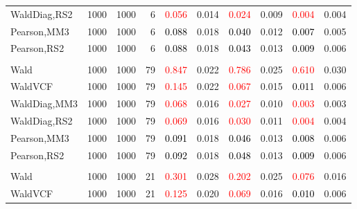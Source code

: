 \documentclass[
]{article}
\begin{document}
\begin{table}[H]
{\begin{tabular}[t]{lrrrrrrlrr}
\hspace{1em}WaldDiag,RS2 & 1000 & 1000 & 6 & \textcolor{red}{0.056} & 0.014 & \textcolor{red}{0.024} & 0.009 & \textcolor{red}{0.004} & 0.004\\
\hspace{1em}Pearson,MM3 & 1000 & 1000 & 6 & \textcolor{black}{0.088} & 0.018 & \textcolor{black}{0.040} & 0.012 & \textcolor{black}{0.007} & 0.005\\
\hspace{1em}Pearson,RS2 & 1000 & 1000 & 6 & \textcolor{black}{0.088} & 0.018 & \textcolor{black}{0.043} & 0.013 & \textcolor{black}{0.009} & 0.006\\
\addlinespace[0.3em]
\multicolumn{10}{l}{\textbf{1F 15V}}\\
\hspace{1em}Wald & 1000 & 1000 & 79 & \textcolor{red}{0.847} & 0.022 & \textcolor{red}{0.786} & 0.025 & \textcolor{red}{0.610} & 0.030\\
\hspace{1em}WaldVCF & 1000 & 1000 & 79 & \textcolor{red}{0.145} & 0.022 & \textcolor{red}{0.067} & 0.015 & \textcolor{black}{0.011} & 0.006\\
\hspace{1em}WaldDiag,MM3 & 1000 & 1000 & 79 & \textcolor{red}{0.068} & 0.016 & \textcolor{red}{0.027} & 0.010 & \textcolor{red}{0.003} & 0.003\\
\hspace{1em}WaldDiag,RS2 & 1000 & 1000 & 79 & \textcolor{red}{0.069} & 0.016 & \textcolor{red}{0.030} & 0.011 & \textcolor{red}{0.004} & 0.004\\
\hspace{1em}Pearson,MM3 & 1000 & 1000 & 79 & \textcolor{black}{0.091} & 0.018 & \textcolor{black}{0.046} & 0.013 & \textcolor{black}{0.008} & 0.006\\
\hspace{1em}Pearson,RS2 & 1000 & 1000 & 79 & \textcolor{black}{0.092} & 0.018 & \textcolor{black}{0.048} & 0.013 & \textcolor{black}{0.009} & 0.006\\
\addlinespace[0.3em]
\multicolumn{10}{l}{\textbf{2F 10V}}\\
\hspace{1em}Wald & 1000 & 1000 & 21 & \textcolor{red}{0.301} & 0.028 & \textcolor{red}{0.202} & 0.025 & \textcolor{red}{0.076} & 0.016\\
\hspace{1em}WaldVCF & 1000 & 1000 & 21 & \textcolor{red}{0.125} & 0.020 & \textcolor{red}{0.069} & 0.016 & \textcolor{black}{0.010} & 0.006\\

\end{tabular}}
\end{table}
\end{document}
